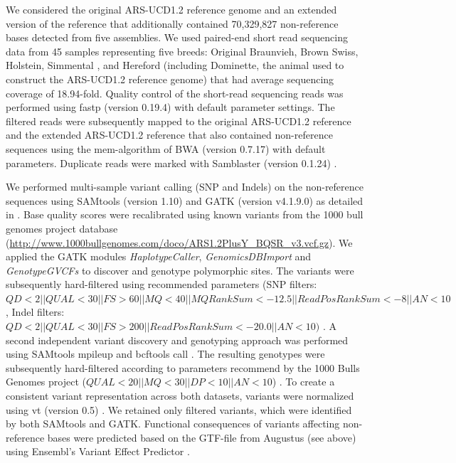 \documentclass[../main.tex]{subfiles}
\begin{document}
We considered the original ARS-UCD1.2 reference genome and an extended version of the reference that additionally contained 70,329,827 non-reference bases detected from five assemblies. We used paired-end short read sequencing data from 45 samples representing five breeds: Original Braunvieh, Brown Swiss, Holstein, Simmental \citep{hafliger2020il17ra}, and Hereford (including Dominette, the animal used to construct the ARS-UCD1.2 reference genome) \citep{rosen2020novo,young2020genomic} that had average sequencing coverage of 18.94-fold. Quality control of the short-read sequencing reads was performed using fastp (version 0.19.4) \citep{chen2018fastp} with default parameter settings. The filtered reads were subsequently mapped to the original ARS-UCD1.2 reference and the extended ARS-UCD1.2 reference that also contained non-reference sequences using the mem-algorithm of BWA (version 0.7.17) \citep{li2013aligning} with default parameters. Duplicate reads were marked with Samblaster (version 0.1.24) \citep{faust2014samblaster}. 

We performed multi-sample variant calling (SNP and Indels) on the non-reference sequences using SAMtools (version 1.10) \citep{li2009sequence} and GATK (version v4.1.9.0) \citep{poplin201178others} as detailed in \citet{crysnanto2019accurate}. Base quality scores were recalibrated using known variants from the 1000 bull genomes project database (\url{http://www.1000bullgenomes.com/doco/ARS1.2PlusY_BQSR_v3.vcf.gz}). We applied the GATK modules \emph{HaplotypeCaller}, \emph{GenomicsDBImport} and \emph{GenotypeGVCFs} to discover and genotype polymorphic sites. The variants were subsequently hard-filtered using recommended parameters (SNP filters: $QD < 2 || QUAL < 30 || FS > 60 || MQ < 40 || MQRankSum < -12.5 || ReadPosRankSum < -8 || AN < 10$, Indel filters: $QD < 2 || QUAL < 30 || FS > 200 || ReadPosRankSum < -20.0 || AN < 10)$ \citep{crysnanto2019accurate}. A second independent variant discovery and genotyping approach was performed using SAMtools mpileup and bcftools call \citep{li2009sequence}. The resulting genotypes were subsequently hard-filtered according to parameters recommend by the 1000 Bulls Genomes project ($QUAL < 20 || MQ < 30 || DP < 10 || AN < 10$) \citep{daetwyler2014whole}. To create a consistent variant representation across both datasets, variants were normalized using vt (version 0.5) \citep{tan2015unified}. We retained only filtered variants, which were identified by both SAMtools and GATK. Functional consequences of variants affecting non-reference bases were predicted based on the GTF-file from Augustus (see above) using Ensembl’s Variant Effect Predictor \citep{mclaren2016ensembl}.
\end{document}
